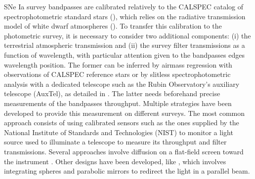 SNe Ia survey bandpasses are calibrated relatively to the CALSPEC catalog of spectrophotometric standard stars (\cite{Bohlin_2020}), which relies on the radiative transmission model of white dwarf atmospheres (\cite{Narayan_2019}). To transfer this calibration to the photometric survey, it is necessary to consider two additional components: (i) the terrestrial atmospheric transmission and (ii) the survey filter transmissions as a function of wavelength, with particular attention given to the bandpasses edges wavelength position. The former can be inferred by airmass regression with observations of CALSPEC reference stars or by slitless spectrophotometric analysis with a dedicated telescope such as the Rubin Observatory's auxiliary telescope (AuxTel), as detailed in \cite{Neveu_2024}. The latter needs beforehand precise measurements of the bandpasses throughput. Multiple strategies have been developed to provide this measurement on different surveys. The most common approach consists of using calibrated sensors such as the ones supplied by the National Institute of Standards and Technologies (NIST) \citep{houston2008detectors} to monitor a light source used to illuminate a telescope to measure its throughput and filter transmissions. Several approaches involve diffusion on a flat-field screen toward the instrument \citep{stubbs2006,marshall2013}. Other designs have been developed, like \cite{Lombardo_2017}, which involves integrating spheres and parabolic mirrors to redirect the light in a parallel beam.

